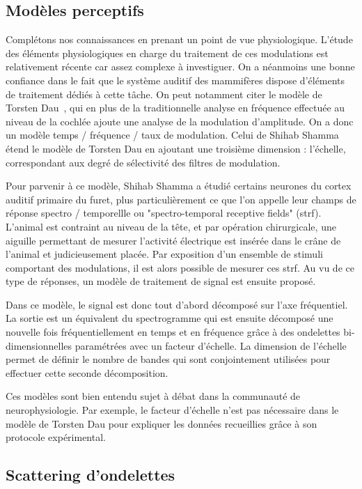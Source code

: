 \subsection{Modèles perceptifs}

Complétons nos connaissances en prenant un point de vue physiologique. L'étude des éléments physiologiques en charge du traitement de ces modulations est relativement récente car assez complexe à investiguer. On a néanmoins une bonne confiance dans le fait que le système auditif des mammifères dispose d'éléments de traitement dédiés à cette tâche. On peut notamment citer le modèle de Torsten Dau~\cite{dau1997modeling}, qui en plus de la traditionnelle analyse en fréquence effectuée au niveau de la cochlée ajoute une analyse de la modulation d'amplitude. On a donc un modèle temps / fréquence / taux de modulation. Celui de Shihab Shamma~\cite{fritz2003rapid} étend le modèle de Torsten Dau en ajoutant une troisième dimension : l'échelle, correspondant aux degré de sélectivité des filtres de modulation.

Pour parvenir à ce modèle, Shihab Shamma a étudié certains neurones du cortex auditif primaire du furet, plus particulièrement ce que l'on appelle leur champs de réponse spectro / temporellle ou "spectro-temporal receptive fields" (strf). L'animal est contraint au niveau de la tête, et par opération chirurgicale, une aiguille permettant de mesurer l'activité électrique est insérée dans le crâne de l'animal et judicieusement placée. Par exposition d'un ensemble de stimuli comportant des modulations, il est alors possible de mesurer ces strf. Au vu de ce type de réponses, un modèle de traitement de signal est ensuite proposé.

Dans ce modèle, le signal est donc tout d'abord décomposé sur l'axe fréquentiel. La sortie est un équivalent du spectrogramme qui est ensuite décomposé une nouvelle fois fréquentiellement en temps et en fréquence grâce à des ondelettes bi-dimensionnelles paramétrées avec un facteur d'échelle. La dimension de l'échelle permet de définir le nombre de bandes qui sont conjointement utilisées pour effectuer cette seconde décomposition.

Ces modèles sont bien entendu sujet à débat dans la communauté de neurophysiologie. Par exemple, le facteur d'échelle n'est pas nécessaire dans le modèle de Torsten Dau pour expliquer les données recueillies grâce à son protocole expérimental.

\subsection{\nmu Scattering d'ondelettes}  \label{sec:scattering}

